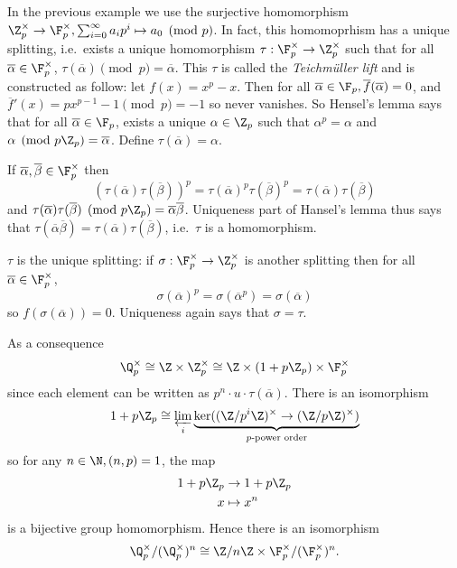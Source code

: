 \documentclass[a4paper]{article}
\begin{document}
In the previous example we use the surjective homomorphism \(\Z_p^\times \to \F_p^\times, \sum_{i = 0}^\infty a_i p^i \mapsto a_0 \pmod p\). In fact, this homomoprhism has a unique splitting, i.e.\ exists a unique homomorphism \(\tau: \F_p^\times \to \Z_p^\times\) such that for all \(\overline \alpha \in \F_p^\times\), \(\tau(\overline \alpha) \pmod p = \overline \alpha\). This \(\tau\) is called the \emph{Teichmüller lift} and is constructed as follow: let \(f(x) = x^p - x\). Then for all \(\overline \alpha \in \F_p, \overline f(\overline \alpha) = 0\), and \(\overline f'(x) = px^{p - 1} - 1 \pmod p = -1\) so never vanishes. So Hensel's lemma says that for all \(\overline \alpha \in \F_p\), exists a unique \(\alpha \in \Z_p\) such that \(\alpha^p = \alpha\) and \(\alpha \pmod{p\Z_p} = \overline \alpha\). Define \(\tau(\overline \alpha) = \alpha\).

If \(\overline \alpha, \overline \beta \in \F_p^\times\) then
\[
  (\tau(\overline \alpha) \tau(\overline \beta))^p
  = \tau(\overline \alpha)^p \tau(\overline \beta)^p
  = \tau(\overline \alpha) \tau(\overline \beta)
\]
and \(\tau(\overline \alpha) \tau(\overline \beta) \pmod{p\Z_p} = \overline \alpha \overline \beta\). Uniqueness part of Hansel's lemma thus says that \(\tau(\overline \alpha \overline \beta) = \tau(\overline \alpha) \tau(\overline \beta)\), i.e.\ \(\tau\) is a homomorphism.

\(\tau\) is the unique splitting: if \(\sigma: \F_p^\times \to \Z_p^\times\) is another splitting then for all \(\overline \alpha \in \F_p^\times\),
\[
  \sigma(\overline \alpha)^p = \sigma(\overline \alpha^p) = \sigma(\overline \alpha)
\]
so \(f(\sigma(\overline \alpha)) = 0\). Uniqueness again says that \(\sigma = \tau\).

As a consequence
\[
  \Q_p^\times \cong \Z \times \Z_p^\times \cong \Z \times (1 + p \Z_p) \times \F_p^\times
\]
since each element can be written as \(p^n \cdot u \cdot \tau(\overline \alpha)\). There is an isomorphism
\[
  1 + p \Z_p \cong \varprojlim_i \underbrace{\ker ((\Z/p^i\Z)^\times \to (\Z/p\Z)^\times)}_{\text{\(p\)-power order}}
\]
so for any \(n \in \N, (n, p) = 1\), the map
\begin{align*}
  1 + p \Z_p &\to 1 + p\Z_p \\
  x &\mapsto x^n
\end{align*}
is a bijective group homomorphism. Hence there is an isomorphism
\[
  \Q_p^\times /(\Q_p^\times)^n \cong \Z/n\Z \times \F_p^\times/(\F_p^\times)^n.
\]
\end{document}
